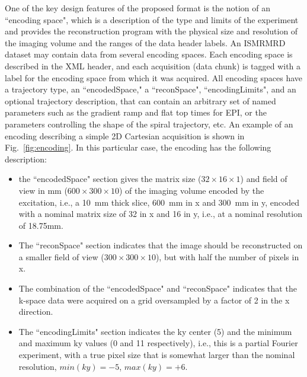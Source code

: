 \documentclass[12pt, draft]{article}
\begin{document}
One of the key design features of the proposed format is the notion of an ``encoding space", which is a description of the type and limits of the experiment and provides the reconstruction program with the physical size and resolution of the imaging volume and the ranges of the data header labels.  An ISMRMRD dataset may contain data from several encoding spaces.  Each encoding space is described in the XML header, and each acquisition (data chunk) is tagged with a label for the encoding space from which it was acquired. All encoding spaces have a trajectory type, an ``encodedSpace," a ``reconSpace", ``encodingLimits", and an optional trajectory description, that can contain an arbitrary set of named parameters such as the gradient ramp and flat top times for EPI, or the parameters controlling the shape of the spiral trajectory, etc.  An example of an encoding describing a simple 2D Cartesian acquisition is shown in Fig.~\ref{fig:encoding}.  In this particular case, the encoding has the following description:
\begin{itemize}
\item the ``encodedSpace" section gives the matrix size ($32\times16\times1$) and field of view in mm ($600\times300\times10$) of the imaging volume encoded by the excitation, i.e.,  a 10~mm thick slice, 600~mm in x and 300~mm in y, encoded with a nominal matrix size of 32 in x and 16 in y, i.e., at a nominal resolution of 18.75mm.
\item The ``reconSpace" section indicates that the image should be reconstructed on a smaller field of view ($300\times300\times10$), but with half the number of pixels in x.
\item The combination of the ``encodedSpace" and ``reconSpace" indicates that the k-space data were acquired on a grid oversampled by a factor of 2 in the x direction.
\item The ``encodingLimits" section indicates the ky center (5) and the minimum and maximum ky values (0 and 11 respectively), i.e., this is a partial Fourier experiment, with a true pixel size that is somewhat larger than the nominal resolution, $min(ky)=-5$, $max(ky)=+6$.
\end{itemize}
\end{document}
